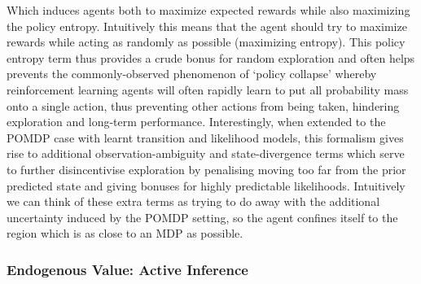 Which induces agents both to maximize expected rewards while also maximizing the policy entropy. Intuitively this means that the agent should try to maximize rewards while acting as randomly as possible (maximizing entropy). This policy entropy term thus provides a crude bonus for random exploration and often helps prevents the commonly-observed phenomenon of `policy collapse' \citep{fujimoto2018addressing} whereby reinforcement learning agents will often rapidly learn to put all probability mass onto a single action, thus preventing other actions from being taken, hindering exploration and long-term performance. Interestingly, when extended to the POMDP case with learnt transition and likelihood models, this formalism gives rise to additional observation-ambiguity and state-divergence terms which serve to further disincentivise exploration by penalising moving too far from the prior predicted state and giving bonuses for highly predictable likelihoods. Intuitively we can think of these extra terms as trying to do away with the additional uncertainty induced by the POMDP setting, so the agent confines itself to the region which is as close to an MDP as possible.

\subsubsection{Endogenous Value: Active Inference}

